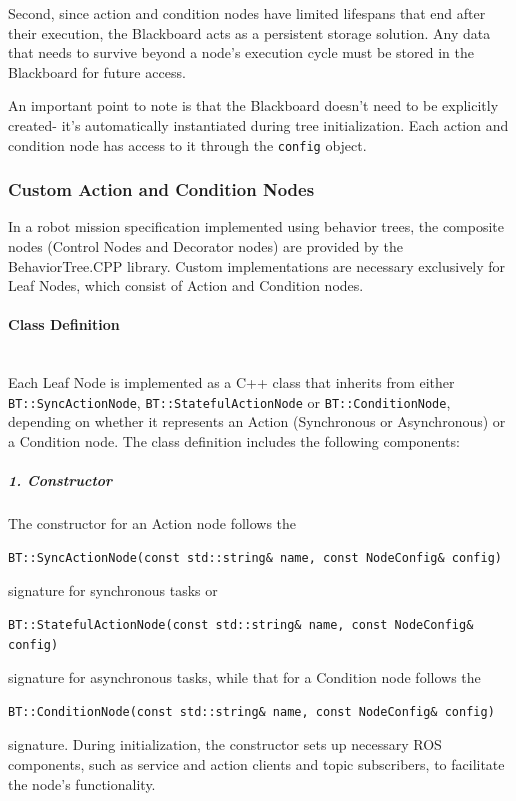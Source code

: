 \documentclass{CSSRforAfrica}
\begin{document}
Second, since action and condition nodes have limited lifespans that end after their execution, the Blackboard acts as a persistent storage solution. Any data that needs to survive beyond a node's execution cycle must be stored in the Blackboard for future access.

An important point to note is that the Blackboard doesn't need to be explicitly created- it's automatically instantiated during tree initialization. Each action and condition node has access to it through the \texttt{\small config} object.



\subsubsection{Custom Action and Condition Nodes}

In a robot mission specification implemented using behavior trees, the composite nodes (Control Nodes and Decorator nodes) are provided by the BehaviorTree.CPP library. Custom implementations are necessary exclusively for Leaf Nodes, which consist of Action and Condition nodes.

\paragraph{Class Definition}\mbox{}\\

Each Leaf Node is implemented as a C++ class that inherits from either \texttt{\small BT::SyncActionNode}, \texttt{\small BT::StatefulActionNode} or \texttt{\small BT::ConditionNode}, depending on whether it represents an Action (Synchronous or Asynchronous) or a Condition node. The class definition includes the following components:

\subparagraph{1. Constructor}

The constructor for an Action node follows the 
\begin{lstlisting}[style=cppstyle]
    BT::SyncActionNode(const std::string& name, const NodeConfig& config)
\end{lstlisting}
signature for synchronous tasks or 
\begin{lstlisting}[style=cppstyle]
    BT::StatefulActionNode(const std::string& name, const NodeConfig& config)
\end{lstlisting}
signature for asynchronous tasks, while that for a Condition node follows the 
\begin{lstlisting}[style=cppstyle]
    BT::ConditionNode(const std::string& name, const NodeConfig& config)
\end{lstlisting}
signature. During initialization, the constructor sets up necessary ROS components, such as service and action clients and topic subscribers, to facilitate the node's functionality.
\end{document}
